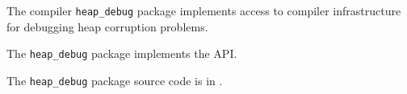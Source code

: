 
The compiler {\tt heap\_debug} package implements access to compiler infrastructure 
for debugging heap corruption problems. 

The {\tt heap\_debug} package implements the  API. 

The {\tt heap\_debug} package source code is in . 






